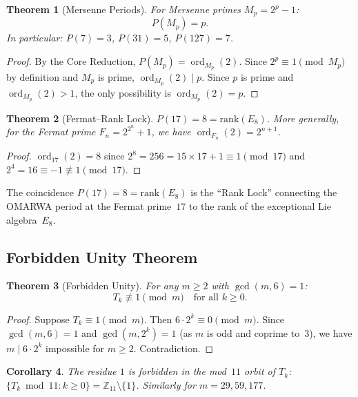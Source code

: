 \documentclass[11pt, a4paper]{article}
\theoremstyle{plain}
\newtheorem{theorem}{Theorem}[section]
\newtheorem{corollary}[theorem]{Corollary}
\theoremstyle{definition}
\theoremstyle{remark}
\newcommand{\ord}{\operatorname{ord}}
\begin{document}
\begin{theorem}[Mersenne Periods]\label{thm:mersenne}
For Mersenne primes $M_p = 2^p - 1$:
\[
  P(M_p) = p.
\]
In particular: $P(7) = 3$, $P(31) = 5$, $P(127) = 7$.
\end{theorem}

\begin{proof}
By the Core Reduction, $P(M_p) = \ord_{M_p}(2)$. Since
$2^p \equiv 1 \pmod{M_p}$ by definition and $M_p$ is prime,
$\ord_{M_p}(2) \mid p$. Since $p$ is prime and $\ord_{M_p}(2) > 1$,
the only possibility is $\ord_{M_p}(2) = p$.
\end{proof}

\begin{theorem}[Fermat--Rank Lock]\label{thm:fermat}
$P(17) = 8 = \mathrm{rank}(E_8)$. More generally, for the Fermat prime
$F_n = 2^{2^n} + 1$, we have $\ord_{F_n}(2) = 2^{n+1}$.
\end{theorem}

\begin{proof}
$\ord_{17}(2) = 8$ since $2^8 = 256 = 15 \times 17 + 1 \equiv 1
\pmod{17}$ and $2^4 = 16 \equiv -1 \not\equiv 1 \pmod{17}$.
\end{proof}

The coincidence $P(17) = 8 = \mathrm{rank}(E_8)$ is the
``Rank Lock'' connecting the OMARWA period at the Fermat prime~$17$
to the rank of the exceptional Lie algebra~$E_8$.

\subsection{Forbidden Unity Theorem}\label{sec:forbidden}

\begin{theorem}[Forbidden Unity]\label{thm:forbidden}
For any $m \geq 2$ with $\gcd(m, 6) = 1$:
\[
  T_k \not\equiv 1 \pmod{m} \quad \text{for all } k \geq 0.
\]
\end{theorem}

\begin{proof}
Suppose $T_k \equiv 1 \pmod{m}$. Then $6 \cdot 2^k \equiv 0 \pmod{m}$.
Since $\gcd(m, 6) = 1$ and $\gcd(m, 2^k) = 1$ (as $m$ is odd and
coprime to~$3$), we have $m \mid 6 \cdot 2^k$ impossible for
$m \geq 2$. Contradiction.
\end{proof}

\begin{corollary}
The residue $1$ is \emph{forbidden} in the mod~$11$ orbit of $T_k$:
$\{T_k \bmod 11 : k \geq 0\} = \mathbb{Z}_{11} \setminus \{1\}$.
Similarly for $m = 29, 59, 177$.
\end{corollary}
\end{document}
